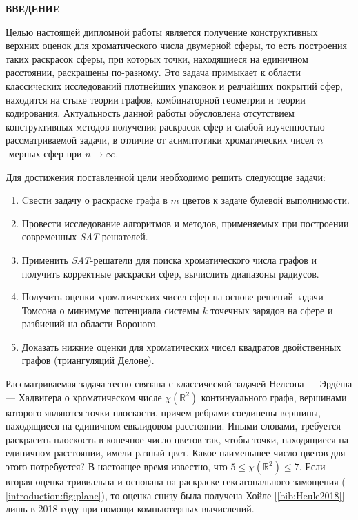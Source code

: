 \newpage
\begin{center}
\noindent\textbf{ВВЕДЕНИЕ}\label{chapters:introduction}
\vspace{1.5mm}
\end{center}

Целью настоящей дипломной работы является получение конструктивных верхних оценок для хроматического числа двумерной сферы, 
то есть построения таких раскрасок сферы, при которых точки, находящиеся на единичном расстоянии, раскрашены по-разному. 
Это задача примыкает к области классических исследований плотнейших упаковок и редчайших покрытий сфер, находится на стыке
теории графов, комбинаторной геометрии и теории кодирования.
Актуальность данной работы обусловлена отсутствием конструктивных методов получения раскрасок сфер и слабой изученностью рассматриваемой задачи, в отличие от асимптотики хроматических чисел $n$-мерных сфер при $n\to\infty$.

Для достижения поставленной цели необходимо решить следующие задачи:

\begin{enumerate}[leftmargin=1cm,topsep=0pt,itemsep=-1ex,partopsep=1ex,parsep=1ex,label=\arabic{*}.]

\item Cвести задачу о раскраске графа в $m$ цветов к задаче булевой выполнимости.
\item Провести исследование алгоритмов и методов, применяемых при построении современных \textit{SAT}-решателей.
\item Применить \textit{SAT}-решатели для поиска хроматического числа графов и получить корректные раскраски сфер, вычислить диапазоны радиусов.
\item Получить оценки хроматических чисел сфер на основе решений задачи Томсона о минимуме потенциала системы $k$ точечных зарядов на сфере и разбиений на области Вороного.
\item Доказать нижние оценки для хроматических чисел квадратов двойственных графов (триангуляций Делоне).

\end{enumerate}

Рассматриваемая задача тесно связана с классической задачей Нелсона — Эрдёша — Хадвигера о хроматическом числе $\chi(\mathbb{R}^2)$ континуального графа, вершинами которого являются точки плоскости, причем ребрами соединены вершины, находящиеся на единичном евклидовом расстоянии. Иными словами, требуется раскрасить плоскость в конечное число цветов так, чтобы точки, находящиеся на единичном расстоянии, имели разный цвет. Какое наименьшее число цветов для этого потребуется? В настоящее время известно, что $5 \leq \chi(\mathbb{R}^2) \leq 7$. Если вторая оценка тривиальна и основана на раскраске гексагонального замощения (\figurename{ \ref{introduction:fig:plane}}), то оценка снизу была получена Хойле [\ref{bib:Heule2018}] лишь в 2018 году при помощи компьютерных вычислений. 


